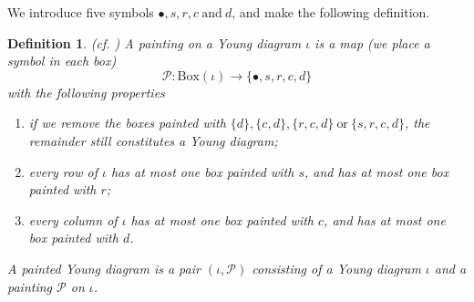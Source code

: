 \documentclass[12pt, a4paper]{amsart}
\numberwithin{equation}{section}
\newtheorem{defn}[thm]{Definition}
\newcommand{\CP}{{\mathcal {P}}}
\begin{document}
We introduce five symbols $\bullet, s, r, c \ \textrm{and} \ d$, and make the following definition.

\begin{defn}(cf. \cite[Definition 2.9.]{BMSZ})
   A painting on a Young diagram $\iota$ is a map (we place a symbol in each box)
   $$\CP : \mathrm{Box}(\iota) \to \{ \bullet, s, r ,c ,d \}$$
   with the following properties

   \begin{enumerate}
      \item if we remove the boxes painted with $\{d\}, \{c,d\}, \{r,c,d\} \ \textrm{or} \  \{s ,r ,c ,d\}$, the remainder still constitutes a Young diagram;
      \item every row of $\iota$ has at most one box painted with $s$, and has at most one box painted with $r$;
      \item every column of $\iota$ has at most one box painted with $c$, and has at most one box painted with $d$.
   \end{enumerate}
   A painted Young diagram is a pair $(\iota, \CP)$ consisting of a Young diagram $\iota$ and a painting $\CP$ on $\iota$.
\end{defn}
\end{document}
